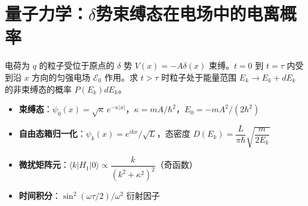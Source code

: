 \section{量子力学：$\delta$势束缚态在电场中的电离概率}
\label{sec:delta-ionization-probability}

\begin{modelbox}
电荷为 $q$ 的粒子受位于原点的 $\delta$ 势 $V(x)=-A\delta(x)$ 束缚。$t=0$ 到 $t=\tau$ 内受到沿 $x$ 方向的匀强电场 $\mathcal{E}_0$ 作用。求 $t>\tau$ 时粒子处于能量范围 $E_k\to E_k+dE_k$ 的非束缚态的概率 $P(E_k)dE_k$。
\end{modelbox}

\begin{tipbox}[考点快速分析]
\begin{itemize}
    \item \textbf{束缚态}：$\psi_0(x)=\sqrt{\kappa}\,e^{-\kappa|x|}$，$\kappa=mA/\hbar^2$，$E_0=-mA^2/(2\hbar^2)$
    \item \textbf{自由态箱归一化}：$\psi_k(x)=e^{ikx}/\sqrt{L}$，态密度 $D(E_k)=\dfrac{L}{\pi\hbar}\sqrt{\dfrac{m}{2E_k}}$
    \item \textbf{微扰矩阵元}：$\langle k|H_1|0\rangle\propto\dfrac{k}{(k^2+\kappa^2)^2}$（奇函数）
    \item \textbf{时间积分}：$\sin^2(\omega\tau/2)/\omega^2$ 衍射因子
\end{itemize}
\end{tipbox}

